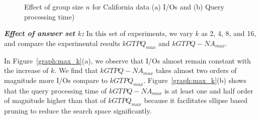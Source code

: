 \begin{figure}[htbp]
\begin{center}
\begin{tabular}{cc}
        \end{tabular}
    \caption{Effect of group size $n$ for California data (a) I/Os and (b) Query processing time)}
    \label{graph:max_g}
  \end{center}
   \vspace{-6mm}
\end{figure}
\vspace*{10pt}


\textbf{\emph{Effect of answer set $k$: }} In this set of experiments, we vary $k$ as 2, 4, 8, and 16, and compare the experimental results $kGTPQ_{max}$ and $kGTPQ-NA_{max}$.

In Figure~\ref{graph:max_k}(a), we observe that I/Os almost remain constant with the increase of $k$.
We find that $kGTPQ-NA_{max}$ takes almost two orders of magnitude
more I/Os compare to $kGTPQ_{max}$. Figure~\ref{graph:max_k}(b) shows that the query processing time of $kGTPQ-NA_{max}$ is at least one and half order of magnitude higher than that of $kGTPQ_{max}$ because it facilitates ellipse based pruning to reduce the search space significantly.



